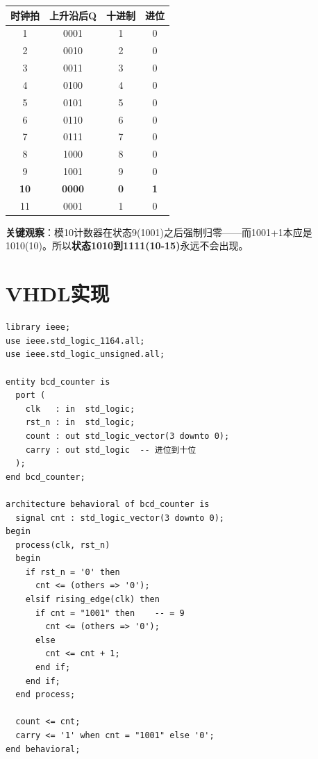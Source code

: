 \begin{beatanalysis}[模10 BCD计数器]
\begin{center}
\begin{tabular}{|c|c|c|c|}
\hline
\textbf{时钟拍} & \textbf{上升沿后Q} & \textbf{十进制} & \textbf{进位} \\
\hline
1 & 0001 & 1 & 0 \\
2 & 0010 & 2 & 0 \\
3 & 0011 & 3 & 0 \\
4 & 0100 & 4 & 0 \\
5 & 0101 & 5 & 0 \\
6 & 0110 & 6 & 0 \\
7 & 0111 & 7 & 0 \\
8 & 1000 & 8 & 0 \\
9 & 1001 & 9 & 0 \\
\hline
\rowcolor{yellow!20}
\textbf{10} & \textbf{0000} & \textbf{0} & \textbf{1} \\
\hline
11 & 0001 & 1 & 0 \\
\hline
\end{tabular}
\end{center}
\end{beatanalysis}

\textbf{关键观察}：模10计数器在状态9(1001)之后强制归零——而1001+1本应是1010(10)。所以\textbf{状态1010到1111(10-15)}永远不会出现。

\section{VHDL实现}

\begin{lstlisting}[caption={模10 BCD计数器（个位）}]
library ieee;
use ieee.std_logic_1164.all;
use ieee.std_logic_unsigned.all;

entity bcd_counter is
  port (
    clk   : in  std_logic;
    rst_n : in  std_logic;
    count : out std_logic_vector(3 downto 0);
    carry : out std_logic  -- 进位到十位
  );
end bcd_counter;

architecture behavioral of bcd_counter is
  signal cnt : std_logic_vector(3 downto 0);
begin
  process(clk, rst_n)
  begin
    if rst_n = '0' then
      cnt <= (others => '0');
    elsif rising_edge(clk) then
      if cnt = "1001" then    -- = 9
        cnt <= (others => '0');
      else
        cnt <= cnt + 1;
      end if;
    end if;
  end process;

  count <= cnt;
  carry <= '1' when cnt = "1001" else '0';
end behavioral;
\end{lstlisting}

